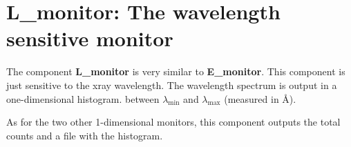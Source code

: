 \section{L\_monitor: The wavelength sensitive monitor}
\label{s:L_monitor}

The component \textbf{L\_monitor} is very similar to
\textbf{E\_monitor}.
This component is just sensitive to the xray wavelength.
The wavelength spectrum is output in a one-dimensional histogram.
between $\lambda_\mathrm{min}$ and $\lambda_\mathrm{max}$ (measured in \AA ).

As for the two other 1-dimensional monitors, this component outputs
the total counts and a file with the histogram.

